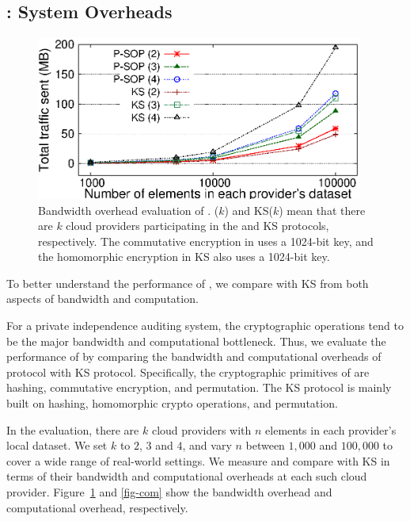 \subsection{\pia: System Overheads}
\label{subsec-micro}

\begin{figure}[tb] \centering
\includegraphics[width=0.96\textwidth]{figs/net.eps}
\caption[Bandwidth overhead evaluation of \pia]{Bandwidth
  overhead evaluation of \pia.  \pso($k$) and KS($k$) mean
  that there are $k$ cloud providers participating in the \pso and KS
  protocols, respectively. The commutative encryption in \pso 
  uses a 1024-bit key, and the homomorphic encryption in KS also 
  uses a 1024-bit key.}
\label{fig-net}
\end{figure}

To better understand the performance of \pia, 
we compare \pso with KS from both aspects of bandwidth and computation.

For a private independence auditing system,
the cryptographic operations tend to be
the major bandwidth and computational bottleneck.
Thus, we evaluate the performance of \pia
by comparing the bandwidth and computational overheads of 
\pso protocol with KS protocol.
Specifically, the cryptographic primitives of \pso
are hashing, commutative encryption, and permutation.
The KS protocol is mainly built on hashing, homomorphic crypto operations,
and permutation.

In the evaluation, there are $k$ cloud providers
with $n$ elements in each provider's local dataset.
We set $k$ to $2$, $3$ and $4$,
and vary $n$ between $1,000$ and $100,000$ to 
cover a wide range of real-world settings.
We measure and compare \pso with KS in terms of their
bandwidth and computational overheads at each such cloud provider.
Figure~\ref{fig-net} and \ref{fig-com}
show the bandwidth overhead and computational overhead, respectively.

